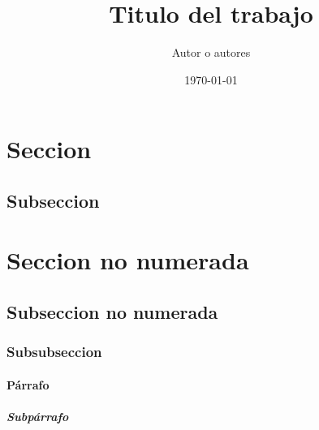 \documentclass[
    a4paper,
    12pt
]{article}
\title{Titulo del trabajo}
\date{\today}
\author{Autor o autores}
\begin{document}
	\maketitle
	\begin{abstract}
		\lipsum[1-2]
	\end{abstract}

    
    \section{Seccion}
	\lipsum[1-1]

    \subsection{Subseccion}
    \lipsum[1-1]
    
    \section*{Seccion no numerada}
    \lipsum[1-1]

    \subsection*{Subseccion no numerada}
    \lipsum[1-1]

    \subsubsection{Subsubseccion}
    \lipsum[1-1]
 
    \paragraph{Párrafo}
    \lipsum[1-1]
    
    \subparagraph{Subpárrafo}
    \lipsum[1-1]
       
\end{document}
